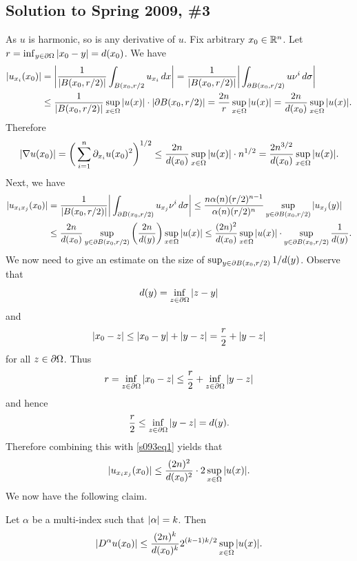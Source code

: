 \subsection*{Solution to Spring 2009, \#3}\label{s093}
As $u$ is harmonic, so is any derivative of $u$. Fix arbitrary $x_{0} \in \mathbb{R}^{n}$. Let $r = \inf_{y \in \partial\Omega}|x_{0} - y| = d(x_{0})$.
We have
\begin{align*}
|u_{x_{i}}(x_{0})| &= \bigg| \frac{1}{|B(x_{0}, r/2)|}\int_{B(x_{0}, r/2}u_{x_{i}}\, dx \bigg| = \frac{1}{|B(x_{0}, r/2)|}\bigg| \int_{\partial B(x_{0}, r/2)}u\nu^{i}\, d\sigma \bigg|\\
&\leq \frac{1}{|B(x_{0}, r/2)|}\sup_{x \in \Omega}|u(x)| \cdot |\partial B(x_{0}, r/2)| = \frac{2n}{r}\sup_{x \in \Omega}|u(x)| = \frac{2n}{d(x_{0})}\sup_{x \in \Omega}|u(x)|.
\end{align*}
Therefore
\begin{align*}
|\nabla u(x_{0})| = \bigg(\sum_{i = 1}^{n}\partial_{x_{i}}u(x_{0})^{2}\bigg)^{1/2} \leq \frac{2n}{d(x_{0})}\sup_{x \in \Omega}|u(x)| \cdot n^{1/2} = \frac{2n^{3/2}}{d(x_{0})}\sup_{x \in \Omega}|u(x)|.
\end{align*}
Next, we have
\begin{equation}\label{s093eq1}
\begin{aligned}
|u_{x_{i}x_{j}}(x_{0})| &= \frac{1}{|B(x_{0}, r/2)|}\bigg| \int_{\partial B(x_{0}, r/2)}u_{x_{j}}\nu^{i}\, d\sigma \bigg| \leq \frac{n\alpha(n)(r/2)^{n - 1}}{\alpha(n)(r/2)^{n}}\sup_{y \in \partial B(x_{0}, r/2)}|u_{x_{j}}(y)|\\
&\leq \frac{2n}{d(x_{0})}\sup_{y \in \partial B(x_{0}, r/2)}\bigg(\frac{2n}{d(y)}\bigg)\sup_{x \in \Omega}|u(x)|\leq \frac{(2n)^{2}}{d(x_{0})}\sup_{x \in \Omega}|u(x)|\cdot \sup_{y \in \partial B(x_{0}, r/2)}\frac{1}{d(y)}.
\end{aligned}
\end{equation}
We now need to give an estimate on the size of $\sup_{y \in \partial B(x_{0}, r/2)}1/d(y)$.
Observe that
$$d(y) = \inf_{z \in \partial\Omega}|z - y|$$
and $$|x_{0} - z| \leq |x_{0} - y| + |y - z| = \frac{r}{2} + |y - z|$$
for all $z \in \partial\Omega$. Thus
$$r = \inf_{z \in \partial\Omega}|x_{0} - z| \leq \frac{r}{2} + \inf_{z \in \partial\Omega}|y - z|$$
and hence
$$\frac{r}{2} \leq \inf_{z \in \partial\Omega}|y - z| = d(y).$$
Therefore combining this with \eqref{s093eq1} yields that
\begin{align*}
|u_{x_{i}x_{j}}(x_{0})| \leq \frac{(2n)^{2}}{d(x_{0})^{2}}\cdot 2\sup_{x \in \Omega}|u(x)|.
\end{align*}
We now have the following claim.
\begin{claim}\label{s093cl1}
Let $\alpha$ be a multi-index such that $|\alpha| = k$. Then
$$|D^{\alpha}u(x_{0})| \leq \frac{(2n)^{k}}{d(x_{0})^{k}}2^{(k - 1)k/2}\sup_{x \in \Omega}|u(x)|.$$
\end{claim}

